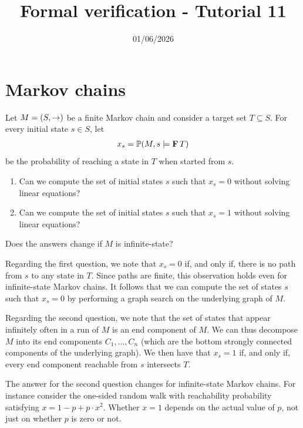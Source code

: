 

\title{Formal verification - Tutorial 11}
\date{01/06/2026}



\maketitle

\section*{Markov chains}

\begin{exercise}
    Let $M = \left( S, \to \right)$ be a finite Markov chain
    and consider a target set $T \subseteq S$.
    For every initial state $s \in S$, let
    \begin{align*}
        x_s = \mathbb P(M, s \models \mathbf F\, T)
    \end{align*}
    be the probability of reaching a state in $T$ when started from $s$.
    \begin{enumerate}
        \item Can we compute the set of initial states
        $s$ such that $x_s = 0$ without solving linear equations?

        \item Can we compute the set of initial states
        $s$ such that $x_s = 1$ without solving linear equations?
    \end{enumerate}
    Does the answers change if $M$ is infinite-state?
\end{exercise}
\begin{solution}
    Regarding the first question, we note that $x_s = 0$ if, and only if, there is no path from $s$ to any state in $T$.
    Since paths are finite, this observation holds even for infinite-state Markov chains.
    It follows that we can compute the set of states $s$ such that $x_s = 0$
    by performing a graph search on the underlying graph of $M$.

    Regarding the second question, we note that the set of states that appear infinitely often in a run of $M$ is an end component of $M$.
    We can thus decompose $M$ into its end components $C_1, \dots, C_n$ (which are the bottom strongly connected components of the underlying graph).
    We then have that $x_s = 1$ if, and only if, every end component reachable from $s$ intersects $T$.

    The answer for the second question changes for infinite-state Markov chains.
    For instance consider the one-sided random walk
    with reachability probability satisfying $x = 1 - p + p \cdot x^2$.
    Whether $x = 1$ depends on the actual value of $p$, not just on whether $p$ is zero or not.
\end{solution}


